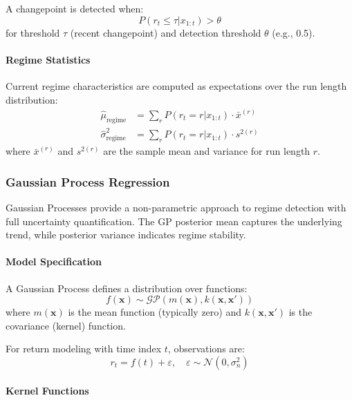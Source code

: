 A changepoint is detected when:
\begin{equation}
  P(r_t \leq \tau | x_{1:t}) > \theta
\end{equation}
for threshold $\tau$ (recent changepoint) and detection threshold $\theta$ (e.g., 0.5).

\paragraph{Regime Statistics}

Current regime characteristics are computed as expectations over the run length distribution:
\begin{align}
  \hat{\mu}_{\text{regime}} &= \sum_{r} P(r_t = r | x_{1:t}) \cdot \bar{x}^{(r)} \\
  \hat{\sigma}_{\text{regime}}^2 &= \sum_{r} P(r_t = r | x_{1:t}) \cdot s^{2(r)}
\end{align}
where $\bar{x}^{(r)}$ and $s^{2(r)}$ are the sample mean and variance for run length $r$.

\subsubsection{Gaussian Process Regression}

Gaussian Processes provide a non-parametric approach to regime detection with full uncertainty quantification. The GP posterior mean captures the underlying trend, while posterior variance indicates regime stability.

\paragraph{Model Specification}

A Gaussian Process defines a distribution over functions:
\begin{equation}
  f(\mathbf{x}) \sim \mathcal{GP}(m(\mathbf{x}), k(\mathbf{x}, \mathbf{x}'))
\end{equation}
where $m(\mathbf{x})$ is the mean function (typically zero) and $k(\mathbf{x}, \mathbf{x}')$ is the covariance (kernel) function.

For return modeling with time index $t$, observations are:
\begin{equation}
  r_t = f(t) + \varepsilon, \quad \varepsilon \sim \mathcal{N}(0, \sigma_n^2)
\end{equation}

\paragraph{Kernel Functions}

